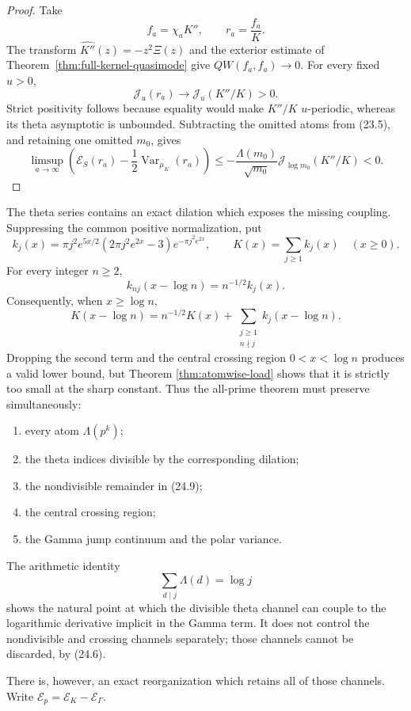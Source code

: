 \documentclass[11pt]{amsart}
\theoremstyle{definition}
\theoremstyle{remark}
\begin{document}
\begin{proof}
Take
\[
 f_a=\chi_aK'',\qquad
 r_a=\frac{f_a}{K}.
\tag{24.4}
\]
The transform \(\widehat{K''}(z)=-z^2\Xi(z)\) and the exterior estimate
of Theorem~\ref{thm:full-kernel-quasimode} give
\(QW(f_a,f_a)\to0\).  For every fixed \(u>0\),
\[
 \mathcal J_u(r_a)\longrightarrow
 \mathcal J_u(K''/K)>0.
\tag{24.5}
\]
Strict positivity follows because equality would make \(K''/K\)
\(u\)-periodic, whereas its theta asymptotic is unbounded.  Subtracting the
omitted atoms from (23.5), and retaining one omitted \(m_0\), gives
\[
 \limsup_{a\to\infty}
 \left(
 \mathscr E_S(r_a)-\frac12\operatorname{Var}_{\mu_K}(r_a)
 \right)
 \le
 -\frac{\Lambda(m_0)}{\sqrt{m_0}}
 \mathcal J_{\log m_0}(K''/K)<0.
\tag{24.6}
\]
\end{proof}

The theta series contains an exact dilation which exposes the missing
coupling.  Suppressing the common positive normalization, put
\[
 k_j(x)=\pi j^2e^{5x/2}
 \left(2\pi j^2e^{2x}-3\right)e^{-\pi j^2e^{2x}},
 \qquad K(x)=\sum_{j\ge1}k_j(x)
 \quad(x\ge0).
\tag{24.7}
\]
For every integer \(n\ge2\),
\[
 \boxed{k_{nj}(x-\log n)=n^{-1/2}k_j(x).}
\tag{24.8}
\]
Consequently, when \(x\ge\log n\),
\[
 K(x-\log n)
 =n^{-1/2}K(x)
 +\sum_{\substack{j\ge1\\n\nmid j}}
   k_j(x-\log n).
\tag{24.9}
\]
Dropping the second term and the central crossing region
\(0<x<\log n\) produces a valid lower bound, but Theorem
\ref{thm:atomwise-load} shows that it is strictly too small at the sharp
constant.  Thus the all-prime theorem must preserve simultaneously:
\begin{enumerate}
\item every atom \(\Lambda(p^k)\);
\item the theta indices divisible by the corresponding dilation;
\item the nondivisible remainder in (24.9);
\item the central crossing region;
\item the Gamma jump continuum and the polar variance.
\end{enumerate}

The arithmetic identity
\[
 \sum_{d\mid j}\Lambda(d)=\log j
\tag{24.10}
\]
shows the natural point at which the divisible theta channel can couple to
the logarithmic derivative implicit in the Gamma term.  It does not control
the nondivisible and crossing channels separately; those channels cannot be
discarded, by (24.6).

There is, however, an exact reorganization which retains all of those
channels.  Write
\(\mathscr E_p=\mathscr E_K-\mathscr E_\Gamma\).
\end{document}
